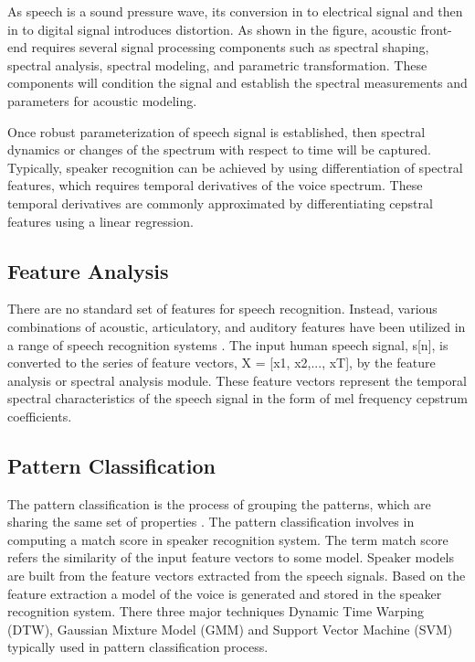 \documentclass[sigconf]{acmart}
\begin{document}
As speech is a sound pressure wave, its conversion in to electrical signal and then in to digital signal introduces distortion. As shown in the figure, acoustic front-end requires several signal processing components such as spectral shaping, spectral analysis, spectral modeling, and parametric transformation. These components will condition the signal and establish the spectral measurements and parameters for acoustic modeling.
\par\null\par
Once robust parameterization of speech signal is established, then spectral dynamics or changes of the spectrum with respect to time will be captured. Typically, speaker recognition can be achieved by using differentiation of spectral features, which requires temporal derivatives of the voice spectrum. These temporal derivatives are commonly approximated by differentiating cepstral features using a linear regression. 

\subsection{Feature Analysis}
There are no standard set of features for speech recognition. Instead, various combinations of acoustic, articulatory, and auditory features have been utilized in a range of speech recognition systems \cite{Rabiner2007}. The input human speech signal, s[n], is converted to the series of feature vectors, X = [x1, x2,..., xT], by the feature analysis or spectral analysis module. These feature vectors represent the temporal spectral characteristics of the speech signal in the form of mel frequency cepstrum coefficients.

\subsection{Pattern Classification}
The pattern classification is the process of grouping the patterns, which are sharing the same set of properties \cite{Chandra2014}. The pattern classification involves in computing a match score in speaker recognition system. The term match score refers the similarity of the input feature vectors to some model. Speaker models are built from the feature vectors extracted from the speech signals. Based on the feature extraction a model of the voice is generated and stored in the speaker recognition system. There three major techniques Dynamic Time Warping (DTW), Gaussian Mixture Model (GMM) and Support Vector Machine (SVM) typically used in pattern classification process. 
\end{document}
